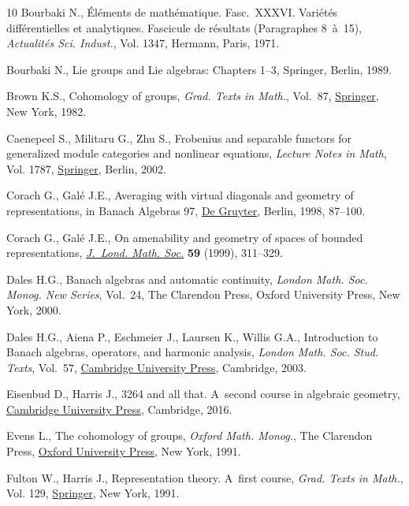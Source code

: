 \documentclass[10pt,a4paper]{amsart}
\numberwithin{equation}{section}
\begin{document}
\begin{thebibliography}{10}
Bourbaki N., \'El\'ements de math\'ematique. {F}asc.~{XXXVI}. {V}ari\'et\'es
 diff\'erentielles et analytiques. {F}ascicule de r\'esultats ({P}aragraphes
 8~\`a~15), \textit{Actualit\'es Sci. Indust.}, Vol. 1347, Hermann, Paris,
 1971.

Bourbaki N., Lie groups and {L}ie algebras: {C}hapters 1--3, Springer, Berlin,
 1989.

Brown K.S., Cohomology of groups, \textit{Grad. Texts in Math.}, Vol.~87,
 \href{https://doi.org/10.1007/978-1-4684-9327-6}{Springer}, New York, 1982.

Caenepeel S., Militaru G., Zhu S., Frobenius and separable functors for
 generalized module categories and nonlinear equations, \textit{Lecture Notes
 in Math}, Vol. 1787, \href{https://doi.org/10.1007/b83849}{Springer}, Berlin, 2002.

Corach G., Gal\'e J.E., Averaging with virtual diagonals and geometry of
 representations, in Banach {A}lgebras 97, \href{https://doi.org/10.1515/9783110802009.87}{De Gruyter}, Berlin, 1998, 87--100.

Corach G., Gal\'e J.E., On amenability and geometry of spaces of bounded
 representations, \href{https://doi.org/10.1112/S0024610798006759}{\textit{J.~Lond. Math. Soc.}} \textbf{59} (1999), 311--329.

Dales H.G., Banach algebras and automatic continuity, \textit{London Math. Soc.
 Monog. New Series}, Vol.~24, The Clarendon Press, Oxford University Press,
 New York, 2000.

Dales H.G., Aiena P., Eschmeier J., Laursen K., Willis G.A., Introduction to
 {B}anach algebras, operators, and harmonic analysis, \textit{London Math.
 Soc. Stud. Texts}, Vol.~57, \href{https://doi.org/10.1017/CBO9780511615429}{Cambridge University Press}, Cambridge, 2003.

Eisenbud D., Harris J., 3264 and all that. {A}~second course in algebraic
 geometry, \href{https://doi.org/10.1017/CBO9781139062046}{Cambridge University Press}, Cambridge, 2016.

Evens L., The cohomology of groups, \textit{Oxford Math. Monog.}, The Clarendon Press,
 \href{https://doi.org/10.1093/oso/9780198535805.001.0001}{Oxford University Press}, New York, 1991.

Fulton W., Harris J., Representation theory. {A}~first course, \textit{Grad.
 Texts in Math.}, Vol. 129, \href{https://doi.org/10.1007/978-1-4612-0979-9}{Springer}, New York, 1991.


\end{thebibliography}
\end{document}
